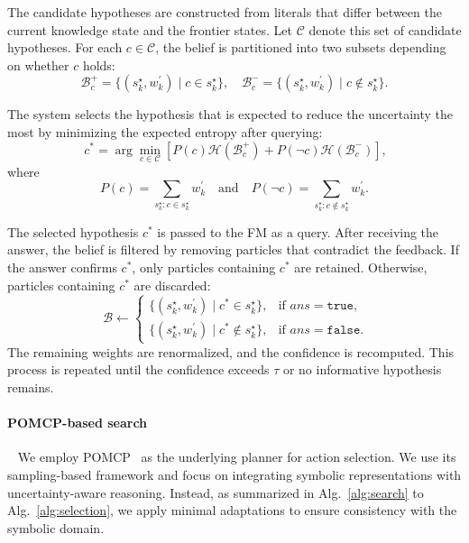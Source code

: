 The candidate hypotheses are constructed from literals that differ between the current knowledge state and the frontier states. Let $\mathcal{C}$ denote this set of candidate hypotheses. For each $c \in \mathcal{C}$, the belief is partitioned into two subsets depending on whether $c$ holds:
$$
\mathcal{B}^{+}_{c} = \{(s_k^{\star}, w_k^\prime) \mid c \in s_k^{\star}\},
\quad
\mathcal{B}^{-}_{c} = \{(s_k^{\star}, w_k^\prime) \mid c \notin s_k^{\star}\}.
$$


The system selects the hypothesis that is expected to reduce the uncertainty the most by minimizing the expected entropy after querying:
\begin{equation}~\label{eq:select_hypo}
c^{*} = \arg\min_{c \in \mathcal{C}}
\left[
P(c)\mathcal{H}(\mathcal{B}^{+}_{c}) +
P(\neg c)\mathcal{H}(\mathcal{B}^{-}_{c})
\right],
\end{equation}
where 
\[P(c)=\sum_{s_k^{\star}: c \in s_k^{\star}} w_k^\prime \quad \text{and} \quad P(\neg c)=\sum_{s_k^{\star}: c \notin s_k^{\star}} w_k^\prime.\]

The selected hypothesis $c^{*}$ is passed to the FM as a query. After receiving the answer, the belief is filtered by removing particles that contradict the feedback. If the answer confirms $c^{*}$, only particles containing $c^{*}$ are retained. Otherwise, particles containing $c^{*}$ are discarded:
\begin{equation}~\label{eq:filter}
\mathcal{B} \leftarrow
\begin{cases}
\{(s_k^{\star}, w_k^\prime) \mid c^{*} \in s_k^{\star}\}, & \text{if } ans = \texttt{true}, \\
\{(s_k^{\star}, w_k^\prime) \mid c^{*} \notin s_k^{\star}\}, & \text{if } ans = \texttt{false}.
\end{cases}
\end{equation}
The remaining weights are renormalized, and the confidence is recomputed. This process is repeated until the confidence exceeds $\tau$ or no informative hypothesis remains.





\paragraph{POMCP-based search}~\label{methd:POMCP}
We employ POMCP~\cite{silver2010monte} as the underlying planner for action selection. We use its sampling-based framework and focus on integrating symbolic representations with uncertainty-aware reasoning. Instead, as summarized in Alg.~\ref{alg:search} to Alg.~\ref{alg:selection}, we apply minimal adaptations to ensure consistency with the symbolic domain. 

